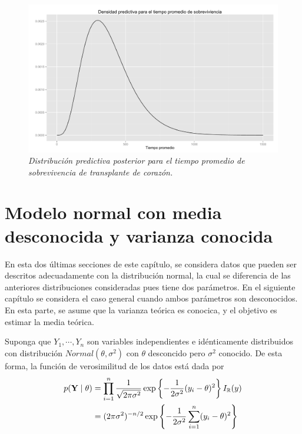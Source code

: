 \documentclass[10pt,openright]{book}\usepackage[]{graphicx}\usepackage[]{color}
\begin{document}
    \begin{figure}[!h]
    \centering
    \includegraphics[scale=0.4]{predexponencial.pdf}
    \caption{\emph{Distribuci\'on predictiva posterior para el tiempo promedio de sobrevivencia de transplante de coraz\'on.}}
    \label{pred_post_expo_eje}
    \end{figure}
    
    \section{Modelo normal con media desconocida y varianza conocida}
    
    En esta dos \'ultimas secciones de este cap\'itulo, se considera datos que pueden ser descritos adecuadamente con la distribuci\'on normal, la cual se diferencia de las anteriores distribuciones consideradas pues tiene dos par\'ametros. En el siguiente cap\'itulo se considera el caso general cuando ambos par\'ametros son desconocidos. En esta parte, se asume que la varianza te\'orica es conocica, y el objetivo es estimar la media te\'orica.
    
    Suponga que $Y_1,\cdots,Y_n$ son variables independientes e id\'enticamente distribuidos con distribuci\'on $Normal(\theta,\sigma^2)$ con $\theta$ desconcido pero $\sigma^2$ conocido. De esta forma, la funci\'on de verosimilitud de los datos est\'a dada por
    \begin{align}
    \label{vero_normal}
    p(\mathbf{Y} \mid \theta)&=\prod_{i=1}^n\frac{1}{\sqrt{2\pi\sigma^2}}\exp\left\{-\frac{1}{2\sigma^2}(y_i-\theta)^2\right\}I_\mathbb{R}(y)\notag\\
    &=(2\pi\sigma^2)^{-n/2}\exp\left\{-\frac{1}{2\sigma^2}\sum_{i=1}^n(y_i-\theta)^2\right\}
    \end{align}
    
\end{document}
